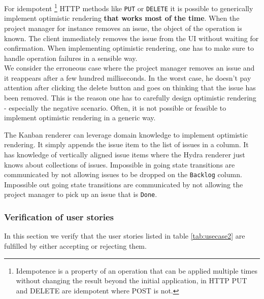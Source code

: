 For idempotent \footnote{Idempotence is a property of an operation that can be applied multiple times without changing the result beyond the initial application, in HTTP PUT and DELETE are idempotent where POST is not.} HTTP methods like \lstinline{PUT} or \lstinline{DELETE} it is possible to generically implement optimistic rendering \textbf{that works most of the time}. When the project manager for instance removes an issue, the object of the operation is known. The client immediately removes the issue from the UI without waiting for confirmation. When implementing optimistic rendering, one has to make sure to handle operation failures in a sensible way. \\
We consider the erroneous case where the project manager removes an issue and it reappears after a few hundred milliseconds. In the worst case, he doesn't pay attention after clicking the delete button and goes on thinking that the issue has been removed. This is the reason one has to carefully design optimistic rendering - especially the negative scenario. Often, it is not possible or feasible to implement optimistic rendering in a generic way.

The Kanban renderer can leverage domain knowledge to implement optimistic rendering. It simply appends the issue item to the list of issues in a column. It has knowledge of vertically aligned issue items where the Hydra renderer just knows about collections of issues. Impossible in going state transitions are communicated by not allowing issues to be dropped on the \lstinline{Backlog} column. Impossible out going state transitions are communicated by not allowing the project manager to pick up an issue that is \lstinline{Done}.

\subsubsection{Verification of user stories}
In this section we verify that the user stories listed in table \ref{tab:usecase2} are fulfilled by either accepting or rejecting them.

